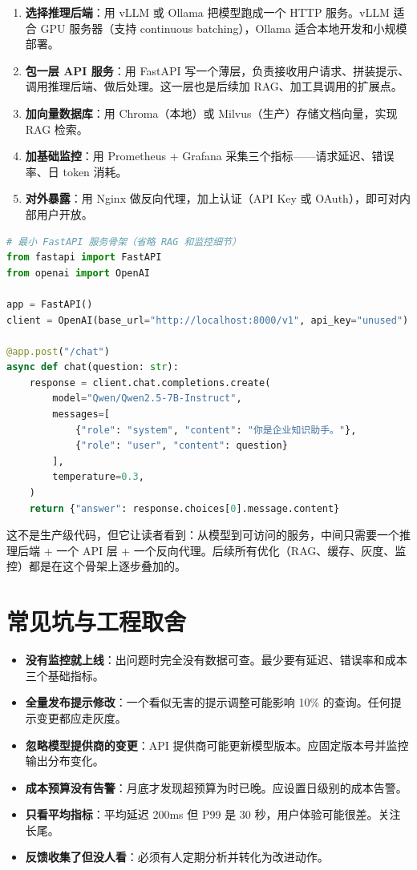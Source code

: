 \begin{enumerate}
  \item \textbf{选择推理后端}：用 vLLM 或 Ollama 把模型跑成一个 HTTP 服务。vLLM 适合 GPU 服务器（支持 continuous batching），Ollama 适合本地开发和小规模部署。
  \item \textbf{包一层 API 服务}：用 FastAPI 写一个薄层，负责接收用户请求、拼装提示、调用推理后端、做后处理。这一层也是后续加 RAG、加工具调用的扩展点。
  \item \textbf{加向量数据库}：用 Chroma（本地）或 Milvus（生产）存储文档向量，实现 RAG 检索。
  \item \textbf{加基础监控}：用 Prometheus + Grafana 采集三个指标——请求延迟、错误率、日 token 消耗。
  \item \textbf{对外暴露}：用 Nginx 做反向代理，加上认证（API Key 或 OAuth），即可对内部用户开放。
\end{enumerate}

\begin{lstlisting}[language=Python]
# 最小 FastAPI 服务骨架（省略 RAG 和监控细节）
from fastapi import FastAPI
from openai import OpenAI

app = FastAPI()
client = OpenAI(base_url="http://localhost:8000/v1", api_key="unused")

@app.post("/chat")
async def chat(question: str):
    response = client.chat.completions.create(
        model="Qwen/Qwen2.5-7B-Instruct",
        messages=[
            {"role": "system", "content": "你是企业知识助手。"},
            {"role": "user", "content": question}
        ],
        temperature=0.3,
    )
    return {"answer": response.choices[0].message.content}
\end{lstlisting}

这不是生产级代码，但它让读者看到：从模型到可访问的服务，中间只需要一个推理后端 + 一个 API 层 + 一个反向代理。后续所有优化（RAG、缓存、灰度、监控）都是在这个骨架上逐步叠加的。

\section{常见坑与工程取舍}
\begin{itemize}
  \item \textbf{没有监控就上线}：出问题时完全没有数据可查。最少要有延迟、错误率和成本三个基础指标。
  \item \textbf{全量发布提示修改}：一个看似无害的提示调整可能影响 10\% 的查询。任何提示变更都应走灰度。
  \item \textbf{忽略模型提供商的变更}：API 提供商可能更新模型版本。应固定版本号并监控输出分布变化。
  \item \textbf{成本预算没有告警}：月底才发现超预算为时已晚。应设置日级别的成本告警。
  \item \textbf{只看平均指标}：平均延迟 200ms 但 P99 是 30 秒，用户体验可能很差。关注长尾。
  \item \textbf{反馈收集了但没人看}：必须有人定期分析并转化为改进动作。
\end{itemize}

